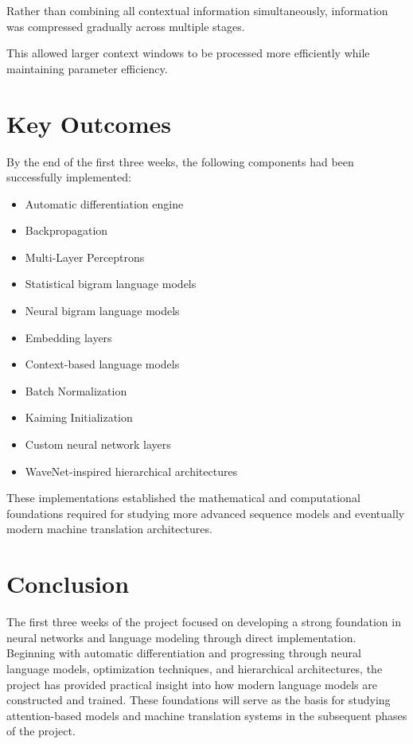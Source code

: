 \documentclass[11pt,a4paper]{article}
\begin{document}
Rather than combining all contextual information simultaneously, information was compressed gradually across multiple stages.

This allowed larger context windows to be processed more efficiently while maintaining parameter efficiency.

\section{Key Outcomes}

By the end of the first three weeks, the following components had been successfully implemented:

\begin{itemize}
    \item Automatic differentiation engine
    \item Backpropagation
    \item Multi-Layer Perceptrons
    \item Statistical bigram language models
    \item Neural bigram language models
    \item Embedding layers
    \item Context-based language models
    \item Batch Normalization
    \item Kaiming Initialization
    \item Custom neural network layers
    \item WaveNet-inspired hierarchical architectures
\end{itemize}

These implementations established the mathematical and computational foundations required for studying more advanced sequence models and eventually modern machine translation architectures.


\section{Conclusion}

The first three weeks of the project focused on developing a strong foundation in neural networks and language modeling through direct implementation. Beginning with automatic differentiation and progressing through neural language models, optimization techniques, and hierarchical architectures, the project has provided practical insight into how modern language models are constructed and trained. These foundations will serve as the basis for studying attention-based models and machine translation systems in the subsequent phases of the project.
\end{document}
